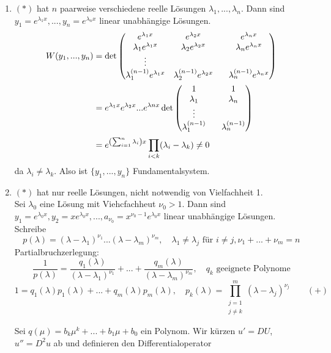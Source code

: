  \begin{enumerate}
 	\item $ (\ast) $ hat $ n $ paarweise verschiedene reelle L\"osungen $ \lambda_1,...,\lambda_n $. Dann sind $ y_1=e^{\lambda_1 x},...,y_n=e^{\lambda_n x} $ linear unabh\"angige L\"osungen.
 	\begin{align*} W(y_1,...,y_n)&=\det \begin{pmatrix}
 	e^{\lambda_1 x}&e^{\lambda_2 x}&\hdotsfor{1}&e^{\lambda_n x}\\
 	\lambda_1 e^{\lambda_1 x}&\lambda_2 e^{\lambda_2 x}&\hdotsfor{1}&\lambda_n e^{\lambda_n x}\\
 	\vdots\\
 	\lambda_1^{(n-1)}e^{\lambda_1 x}&\lambda_2^{(n-1)}e^{\lambda_2 x}&\hdotsfor{1}&\lambda_n^{(n-1)}e^{\lambda_n x}
 	\end{pmatrix}\\&=e^{\lambda_1 x}e^{\lambda_2 x}...e^{\lambda n x}\det \begin{pmatrix}
 	1&\hdotsfor{1}&1\\
 	\lambda_1&\hdotsfor{1}&\lambda_n\\
 	\vdots\\
 	\lambda_1^{(n-1)}&\hdotsfor{1}&\lambda_n^{(n-1)}
 	\end{pmatrix}\\&=e^{\left(\sum_{i=1}^{n}\lambda_i\right)x}\prod_{i<k}^{}(\lambda_i-\lambda_k)\neq 0 \end{align*}
 	da $ \lambda_i\neq\lambda_k $. Also ist $ \lbrace y_1,...,y_n\rbrace $ Fundamentalsystem.
 	\item $ (\ast) $ hat nur reelle L\"osungen, nicht notwendig von Vielfachheit 1.\\
 	Sei $ \lambda_0 $ eine L\"osung mit Viehcfachheut $ \nu_0>1 $. Dann sind $ y_1=e^{\lambda_0 x}, y_2=xe^{\lambda_0 x},...,a_{\nu_0}=x^{\nu_0-1}e^{\lambda_0 x} $ linear unabh\"angige L\"osungen. Schreibe
 	\[ p(\lambda)=(\lambda-\lambda_1)^{\nu_1}...(\lambda-\lambda_m)^{\nu_m},\quad \lambda_1\neq\lambda_j\text{ f\"ur }i\neq j, \nu_1+...+\nu_m=n \]
 	Partialbruchzerlegung:
 	\[ \frac{1}{p(\lambda)}=\frac{q_1(\lambda)}{(\lambda-\lambda_1)^{\nu_1}}+...+\frac{q_m(\lambda)}{(\lambda-\lambda_m)^{\nu_m}},\quad q_k\text{ geeignete Polynome} \]
 	\[ 1=q_1(\lambda)p_1(\lambda)+...+q_m(\lambda)p_m(\lambda),\quad p_k(\lambda)=\prod_{\substack{j=1\\j\neq k}}^{m}(\lambda-\lambda_j)^{\nu_j}\qquad (+) \]
 	\begin{bemerkung*}[Schreibweise]
 		Sei $ q(\mu)=b_k\mu^k+...+b_1\mu+b_0 $ ein Polynom. Wir k\"urzen $ u'=DU $, $ u''=D^2u $ ab und definieren den Differentialoperator

\end{bemerkung*}
\end{enumerate}
